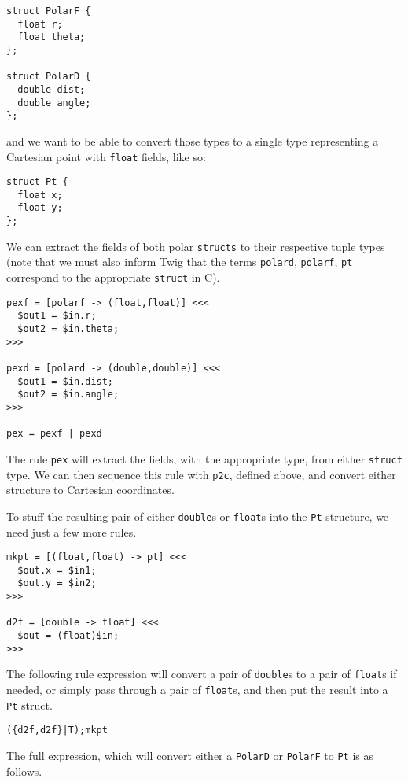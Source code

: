 \begin{verbatim}
struct PolarF {
  float r;
  float theta;
};

struct PolarD {
  double dist;
  double angle;
};
\end{verbatim}

and we want to be able to convert those types to a single type representing a Cartesian point with \texttt{float} fields, like so:

\begin{verbatim}
struct Pt {
  float x;
  float y;
};
\end{verbatim}

We can extract the fields of both polar \texttt{structs} to their respective tuple types (note that we must also inform Twig that the terms \texttt{polard}, \texttt{polarf}, \texttt{pt} correspond to the appropriate \texttt{struct} in C).

\begin{verbatim}
pexf = [polarf -> (float,float)] <<<
  $out1 = $in.r;
  $out2 = $in.theta;
>>>

pexd = [polard -> (double,double)] <<<
  $out1 = $in.dist;
  $out2 = $in.angle;
>>>

pex = pexf | pexd
\end{verbatim}

The rule \texttt{pex} will extract the fields, with the appropriate type, from either \texttt{struct} type. We can then sequence this rule with \texttt{p2c}, defined above, and convert either structure to Cartesian coordinates.

To stuff the resulting pair of either \texttt{double}s or \texttt{float}s into the \texttt{Pt} structure, we need just a few more rules. 

\begin{verbatim}
mkpt = [(float,float) -> pt] <<<
  $out.x = $in1;
  $out.y = $in2;
>>>

d2f = [double -> float] <<<
  $out = (float)$in;
>>>
\end{verbatim}

The following rule expression will convert a pair of \texttt{double}s to a pair of \texttt{float}s if needed, or simply pass through a pair of \texttt{float}s, and then put the result into a \texttt{Pt} struct.

\begin{verbatim}
({d2f,d2f}|T);mkpt
\end{verbatim}

The full expression, which will convert either a \texttt{PolarD} or \texttt{PolarF} to \texttt{Pt} is as follows.


